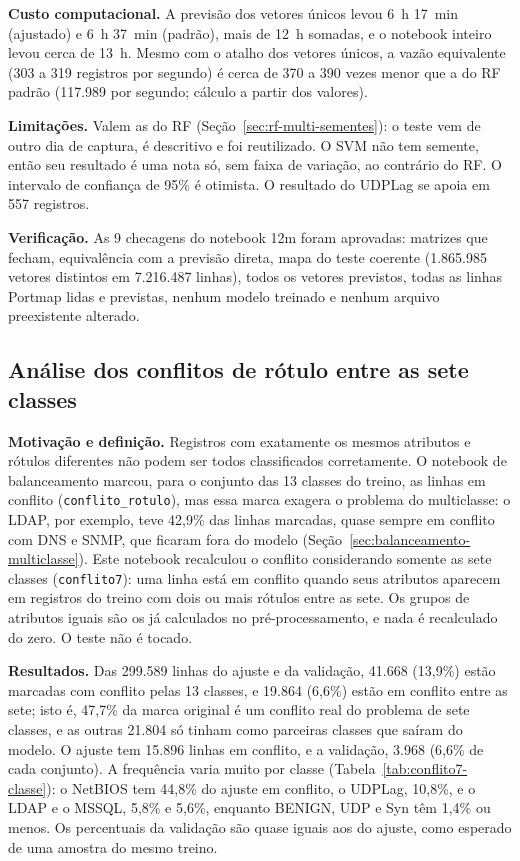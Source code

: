 \documentclass[
    12pt,                %
    openright,           %
    oneside,             %
    a4paper,             %
    english,             %
    brazil               %
]{abntex2}
\begin{document}
\textbf{Custo computacional.} A previsão dos vetores únicos levou 6~h 17~min (ajustado) e 6~h 37~min (padrão), mais de 12~h somadas, e o notebook inteiro levou cerca de 13~h. Mesmo com o atalho dos vetores únicos, a vazão equivalente (303 a 319 registros por segundo) é cerca de 370 a 390 vezes menor que a do RF padrão (117.989 por segundo; cálculo a partir dos valores).
 
\textbf{Limitações.} Valem as do RF (Seção~\ref{sec:rf-multi-sementes}): o teste vem de outro dia de captura, é descritivo e foi reutilizado. O SVM não tem semente, então seu resultado é uma nota só, sem faixa de variação, ao contrário do RF. O intervalo de confiança de 95\% é otimista. O resultado do UDPLag se apoia em 557 registros.
 
\textbf{Verificação.} As 9 checagens do notebook 12m foram aprovadas: matrizes que fecham, equivalência com a previsão direta, mapa do teste coerente (1.865.985 vetores distintos em 7.216.487 linhas), todos os vetores previstos, todas as linhas Portmap lidas e previstas, nenhum modelo treinado e nenhum arquivo preexistente alterado.
 
 
\subsection{Análise dos conflitos de rótulo entre as sete classes}
\label{sec:conflitos-multiclasse}
 
\textbf{Motivação e definição.} Registros com exatamente os mesmos atributos e rótulos diferentes não podem ser todos classificados corretamente. O notebook de balanceamento marcou, para o conjunto das 13 classes do treino, as linhas em conflito (\texttt{conflito\_rotulo}), mas essa marca exagera o problema do multiclasse: o LDAP, por exemplo, teve 42,9\% das linhas marcadas, quase sempre em conflito com DNS e SNMP, que ficaram fora do modelo (Seção~\ref{sec:balanceamento-multiclasse}). Este notebook recalculou o conflito considerando somente as sete classes (\texttt{conflito7}): uma linha está em conflito quando seus atributos aparecem em registros do treino com dois ou mais rótulos entre as sete. Os grupos de atributos iguais são os já calculados no pré-processamento, e nada é recalculado do zero. O teste não é tocado.
 
\textbf{Resultados.} Das 299.589 linhas do ajuste e da validação, 41.668 (13,9\%) estão marcadas com conflito pelas 13 classes, e 19.864 (6,6\%) estão em conflito entre as sete; isto é, 47,7\% da marca original é um conflito real do problema de sete classes, e as outras 21.804 só tinham como parceiras classes que saíram do modelo. O ajuste tem 15.896 linhas em conflito, e a validação, 3.968 (6,6\% de cada conjunto). A frequência varia muito por classe (Tabela~\ref{tab:conflito7-classe}): o NetBIOS tem 44,8\% do ajuste em conflito, o UDPLag, 10,8\%, e o LDAP e o MSSQL, 5,8\% e 5,6\%, enquanto BENIGN, UDP e Syn têm 1,4\% ou menos. Os percentuais da validação são quase iguais aos do ajuste, como esperado de uma amostra do mesmo treino.
 
\end{document}
